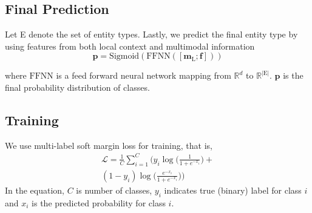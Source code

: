\subsection{Final Prediction}

Let E denote the set of entity types. Lastly, we predict the final entity type by using features from both local context and multimodal information
\begin{equation}
\mathbf{p}=\text{Sigmoid}(\text{FFNN}([\mathbf{m}_\text{L};\mathbf{f}]))\end{equation}

\noindent where $\text{FFNN}$ is a feed forward neural network mapping from $\mathbb{R}^d$ to $\mathbb{R}^{|\text{E}|}$. $\mathbf{p}$ is the final probability distribution of classes.

\subsection{Training}
We use multi-label soft margin loss for training, that is,
\begin{equation}
\begin{split}
    \mathcal{L}=\frac{1}{C}\sum_{i=1}^{C}\Bigg( y_i\log\bigg(\frac{1}{1+e^{-x_i}}\bigg) +\\ (1-y_i)\log\bigg(\frac{e^{-x_i}}{1+e^{-x_i}}\bigg)\Bigg)
\end{split}
\end{equation}
\noindent In the equation, $C$ is number of classes, $y_i$ indicates true (binary) label for class $i$ and $x_i$ is the predicted probability for class $i$.










